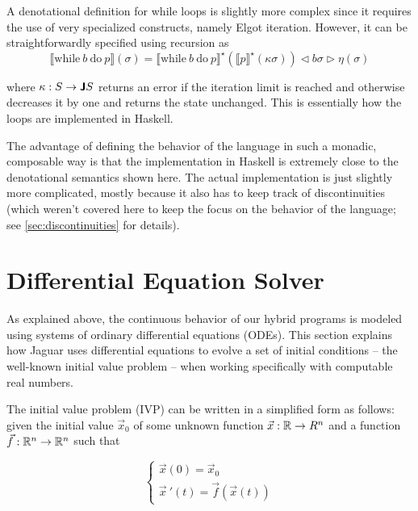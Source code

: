 A denotational definition for while loops is slightly more complex since it requires the use of very specialized constructs, namely Elgot iteration. However, it can be straightforwardly specified using recursion as
\begin{equation*}
  \llbracket \text{while}\ b\ \text{do}\ p \rrbracket (\sigma) = \llbracket \text{while}\ b\ \text{do}\ p \rrbracket^{\star} (\llbracket p \rrbracket^{\star} (\kappa \sigma)) \triangleleft b \sigma \triangleright \eta (\sigma)
\end{equation*}

where $\kappa : S \rightarrow \textbf{\textsf{J}} S$ returns an error if the iteration limit is reached and otherwise decreases it by one and returns the state unchanged. This is essentially how the loops are implemented in Haskell. 

The advantage of defining the behavior of the language in such a monadic, composable way is that the implementation in Haskell is extremely close to the denotational semantics shown here. The actual implementation is just slightly more complicated, mostly because it also has to keep track of discontinuities (which weren't covered here to keep the focus on the behavior of the language; see \cref{sec:discontinuities} for details).

\section{Differential Equation Solver}
\label{sec:solver}

As explained above, the continuous behavior of our hybrid programs is modeled using systems of ordinary differential equations (ODEs). This section explains how Jaguar uses differential equations to evolve a set of initial conditions -- the well-known initial value problem -- when working specifically with computable real numbers.

The initial value problem (IVP) can be written in a simplified form as follows: given the initial value $\vec{x}_0$ of some unknown function $\vec{x}: \mathbb{R} \rightarrow R^n$ and a function $\vec{f}: \mathbb{R}^n \rightarrow \mathbb{R}^n$ such that

\begin{equation}
\label{eq:ode}
  \begin{cases} 
    \vec{x}(0) = \vec{x}_0 \\
    \vec{x}\ '(t) = \vec{f}(\vec{x}(t))
  \end{cases}
\end{equation}

